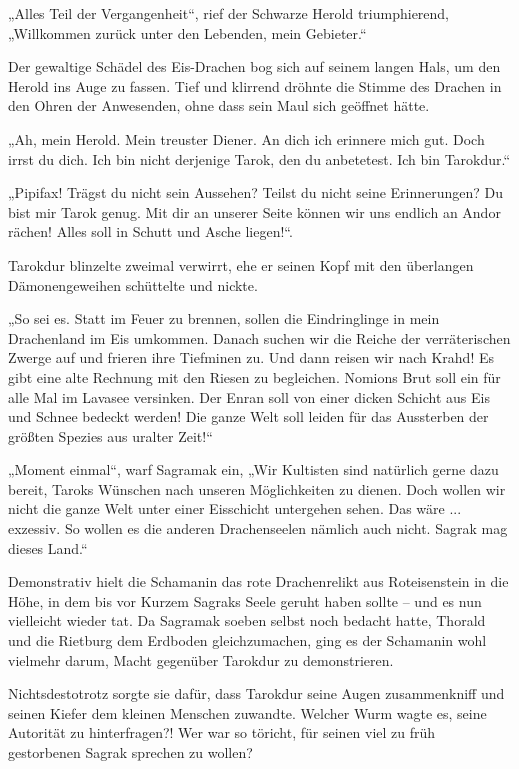 „Alles Teil der Vergangenheit“, rief der Schwarze Herold triumphierend, „Willkommen zurück unter den Lebenden, mein Gebieter.“

Der gewaltige Schädel des Eis-Drachen bog sich auf seinem langen Hals, um den Herold ins Auge zu fassen. Tief und klirrend dröhnte die Stimme des Drachen in den Ohren der Anwesenden, ohne dass sein Maul sich geöffnet hätte.

„Ah, mein Herold. Mein treuster Diener. An dich ich erinnere mich gut. Doch irrst du dich. Ich bin nicht derjenige Tarok, den du anbetetest. Ich bin Tarokdur.“

„Pipifax! Trägst du nicht sein Aussehen? Teilst du nicht seine Erinnerungen? Du bist mir Tarok genug. Mit dir an unserer Seite können wir uns endlich an Andor rächen! Alles soll in Schutt und Asche liegen!“.

Tarokdur blinzelte zweimal verwirrt, ehe er seinen Kopf mit den überlangen Dämonengeweihen schüttelte und nickte.

„So sei es. Statt im Feuer zu brennen, sollen die Eindringlinge in mein Drachenland im Eis umkommen. Danach suchen wir die Reiche der verräterischen Zwerge auf und frieren ihre Tiefminen zu. Und dann reisen wir nach Krahd! Es gibt eine alte Rechnung mit den Riesen zu begleichen. Nomions Brut soll ein für alle Mal im Lavasee versinken. Der Enran soll von einer dicken Schicht aus Eis und Schnee bedeckt werden! Die ganze Welt soll leiden für das Aussterben der größten Spezies aus uralter Zeit!“

„Moment einmal“, warf Sagramak ein, „Wir Kultisten sind natürlich gerne dazu bereit, Taroks Wünschen nach unseren Möglichkeiten zu dienen. Doch wollen wir nicht die ganze Welt unter einer Eisschicht untergehen sehen. Das wäre ... exzessiv. So wollen es die anderen Drachenseelen nämlich auch nicht. Sagrak mag dieses Land.“

Demonstrativ hielt die Schamanin das rote Drachenrelikt aus Roteisenstein in die Höhe, in dem bis vor Kurzem Sagraks Seele geruht haben sollte – und es nun vielleicht wieder tat. Da Sagramak soeben selbst noch bedacht hatte, Thorald und die Rietburg dem Erdboden gleichzumachen, ging es der Schamanin wohl vielmehr darum, Macht gegenüber Tarokdur zu demonstrieren.

Nichtsdestotrotz sorgte sie dafür, dass Tarokdur seine Augen zusammenkniff und seinen Kiefer dem kleinen Menschen zuwandte. Welcher Wurm wagte es, seine Autorität zu hinterfragen?! Wer war so töricht, für seinen viel zu früh gestorbenen Sagrak sprechen zu wollen?

